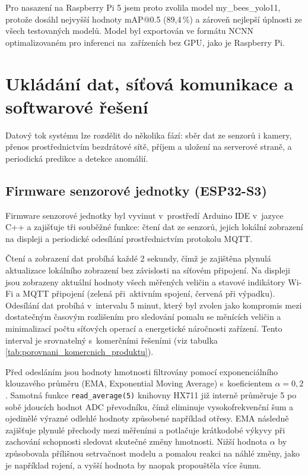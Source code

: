 Pro nasazení na Raspberry Pi 5 jsem proto zvolila model my\_bees\_yolo11, protože dosáhl nejvyšší hodnoty mAP@0.5 (89,4\,\%) a zároveň nejlepší úplnosti ze všech testovaných modelů. Model byl exportován ve formátu NCNN optimalizovaném pro inferenci na~zařízeních bez GPU, jako je Raspberry Pi.

\section{Ukládání dat, síťová komunikace a softwarové řešení}
Datový tok systému lze rozdělit do několika fází: sběr dat ze senzorů i kamery, přenos prostřednictvím bezdrátové sítě, příjem a uložení na serverové straně, a periodická predikce a detekce anomálií.

\subsection*{Firmware senzorové jednotky (ESP32-S3)}
Firmware senzorové jednotky byl vyvinut v~prostředí Arduino IDE v~jazyce C++ a zajišťuje tři souběžné funkce: čtení dat ze senzorů, jejich lokální zobrazení na displeji a periodické odesílání prostřednictvím protokolu MQTT.

Čtení a zobrazení dat probíhá každé 2 sekundy, čímž je zajištěna plynulá aktualizace lokálního zobrazení bez závislosti na síťovém připojení. Na displeji jsou zobrazeny aktuální hodnoty všech měřených veličin a stavové indikátory Wi-Fi a MQTT připojení (zelená při~aktivním spojení, červená při výpadku). Odesílání dat probíhá v~intervalu 5 minut, který byl zvolen jako kompromis mezi dostatečným časovým rozlišením pro sledování pomalu se měnících veličin a minimalizací počtu síťových operací a energetické náročnosti zařízení. Tento interval je srovnatelný s~komerčními řešeními (viz tabulka \ref{tab:porovnani_komercnich_produktu}).

Před odesláním jsou hodnoty hmotnosti filtrovány pomocí exponenciálního klouzavého průměru (EMA, Exponential Moving Average) s~koeficientem $\alpha = 0{,}2$. Samotná funkce \texttt{read\_average(5)} knihovny HX711 již interně průměruje 5 po sobě jdoucích hodnot ADC převodníku, čímž eliminuje vysokofrekvenční šum a ojedinělé výrazné odlehlé hodnoty způsobené například otřesy. EMA následně zajišťuje plynulé přechody mezi měřeními a potlačuje krátkodobé výkyvy při zachování schopnosti sledovat skutečné změny hmotnosti. Nižší hodnota $\alpha$ by způsobovala přílišnou setrvačnost modelu a pomalou reakci na náhlé změny, jako je například rojení, a vyšší hodnota by naopak propouštěla více šumu.


